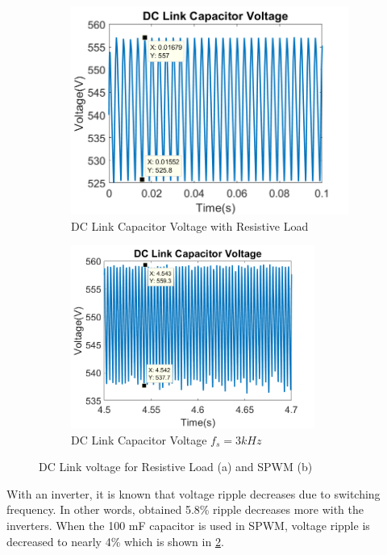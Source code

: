 \begin{figure}[H]
        \centering
        \begin{subfigure}[b]{0.475\textwidth}
            \centering
\includegraphics [width= 8 cm]{figs/dclinkvoltage.png}
\caption{DC Link Capacitor Voltage with Resistive Load}
\label{fig: dclink}
        \end{subfigure}
        \hfill
        \begin{subfigure}[b]{0.475\textwidth}  
          \centering
\includegraphics [width= 8cm]{figs/dclinkvoltage_spvm.png}
\caption{DC Link Capacitor Voltage $f_s = 3kHz$}
\label{fig: dclink_spwm}
        \end{subfigure}
        \caption{DC Link voltage for Resistive Load (a) and SPWM (b)}
        \label{fig:b4}
        \end{figure}  

With an inverter, it is known that voltage ripple decreases due to switching frequency. In other words, obtained 5.8\% ripple decreases more with the inverters. When the 100 mF capacitor is used in SPWM, voltage ripple is decreased to nearly 4\% which is shown in \ref{fig: dclink_spwm}.
